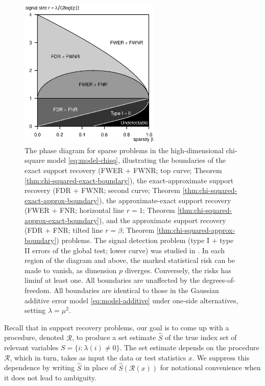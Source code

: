 \begin{figure}
      \centering
      \includegraphics[width=0.6\textwidth]{./phase_diagram_chisquared_ALL_boundaries.eps}
      \caption{The phase diagram for sparse problems in the high-dimensional chi-square model \eqref{eq:model-chisq}, illustrating the boundaries of the exact support recovery (FWER + FWNR; top curve; Theorem \ref{thm:chi-squared-exact-boundary}),
      the exact-approximate support recovery (FDR + FWNR; second curve; Theorem \ref{thm:chi-squared-exact-approx-boundary}),
      the approximate-exact support recovery (FWER + FNR; horizontal line $r=1$; Theorem \ref{thm:chi-squared-approx-exact-boundary}),
      and the approximate support recovery (FDR + FNR; tilted line $r=\beta$; Theorem \ref{thm:chi-squared-approx-boundary}) problems.
      The signal detection problem (type I + type II errors of the global test; lower curve) was studied in \citep{donoho2004higher}. 
      In each region of the diagram and above, the marked statistical risk can be made to vanish, as dimension $p$ diverges. 
      Conversely, the risks has liminf at least one.
      All boundaries are unaffected by the degrees-of-freedom.
      All boundaries are identical to those in the Gaussian additive error model \eqref{eq:model-additive} under one-side alternatives, setting $\lambda=\mu^2$.} 
      \label{fig:phase-chi-squared}
\end{figure}

Recall that in support recovery problems, our goal is to come up with a procedure, denoted $\mathcal R$, to produce a set estimate $\widehat{S}$ of the true index set of relevant variables  $S=\{i:\lambda(i)\neq 0\}$.
The set estimate depends on the procedure $\mathcal{R}$, which in turn, takes as input the data or test statistics $x$.
We suppress this dependence by writing $\widehat{S}$ in place of $\widehat{S}(\mathcal{R}(x))$ for notational convenience when it does not lead to ambiguity.

